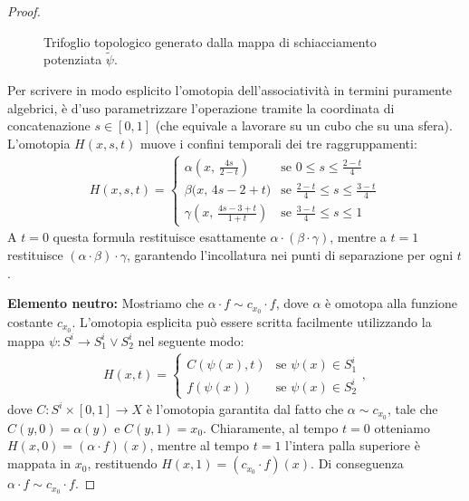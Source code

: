 \begin{proof}
\begin{figure}[htbp]
    \caption{Trifoglio topologico generato dalla mappa di schiacciamento potenziata $\tilde{\psi}$.}
    \end{figure}

    Per scrivere in modo esplicito l'omotopia dell'associatività in termini puramente algebrici, è d'uso parametrizzare l'operazione tramite la coordinata di concatenazione $s \in [0,1]$ (che equivale a lavorare su un cubo che su una sfera). L'omotopia $H(x, s, t)$ muove i confini temporali dei tre raggruppamenti:
    \begin{align}
        H(x, s, t) = \begin{cases}
            \alpha\left(x, \, \frac{4s}{2-t}\right) & \text{se } 0 \leq s \leq \frac{2-t}{4} \\[8pt]
            \beta\Big(x, \, 4s - 2 + t\Big) & \text{se } \frac{2-t}{4} \leq s \leq \frac{3-t}{4} \\[8pt]
            \gamma\left(x, \, \frac{4s - 3 + t}{1+t}\right) & \text{se } \frac{3-t}{4} \leq s \leq 1
        \end{cases}
    \end{align}
    A $t=0$ questa formula restituisce esattamente $\alpha \cdot (\beta \cdot \gamma)$, mentre a $t=1$ restituisce $(\alpha \cdot \beta) \cdot \gamma$, garantendo l'incollatura nei punti di separazione per ogni $t$.

    \textbf{Elemento neutro:} Mostriamo che $\alpha \cdot f \sim c_{x_0} \cdot f$, dove $\alpha$ è omotopa alla funzione costante $c_{x_0}$. L'omotopia esplicita può essere scritta facilmente utilizzando la mappa $\psi: S^i \to S^i_1 \vee S^i_2$ nel seguente modo:
    \begin{align}
        H(x, t) = \begin{cases}
            C(\psi(x), t) & \text{se } \psi(x) \in S^i_1 \\
            f(\psi(x)) & \text{se } \psi(x) \in S^i_2
        \end{cases},
    \end{align}
    dove $C: S^i \times [0,1] \to X$ è l'omotopia garantita dal fatto che $\alpha \sim c_{x_0}$, tale che $C(y, 0) = \alpha(y)$ e $C(y, 1) = x_0$. Chiaramente, al tempo $t=0$ otteniamo $H(x, 0) = (\alpha \cdot f)(x)$, mentre al tempo $t=1$ l'intera palla superiore è mappata in $x_0$, restituendo $H(x, 1) = (c_{x_0} \cdot f)(x)$. Di conseguenza $\alpha \cdot f \sim c_{x_0} \cdot f$. 
    

\end{proof}
